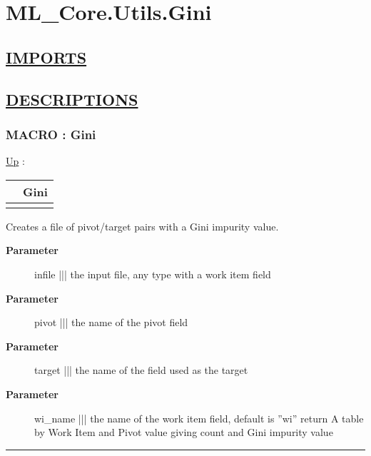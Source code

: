 \chapter*{ML\_Core.Utils.Gini}
\hypertarget{ecldoc:toc:ML_Core.Utils.Gini}{}

\section*{\underline{IMPORTS}}

\section*{\underline{DESCRIPTIONS}}
\subsection*{MACRO : Gini}
\hypertarget{ecldoc:ml_core.utils.gini}{}
\hyperlink{ecldoc:toc:ML_Core/Utils}{Up} :

{\renewcommand{\arraystretch}{1.5}
\begin{tabularx}{\textwidth}{|>{\raggedright\arraybackslash}l|X|}
\hline
\hspace{0pt} & Gini \\
\hline
\multicolumn{2}{|>{\raggedright\arraybackslash}X|}{\hspace{0pt}(infile, pivot, target, wi\_name='wi')} \\
\hline
\end{tabularx}
}

\par
Creates a file of pivot/target pairs with a Gini impurity value.

\par
\begin{description}
\item [\textbf{Parameter}] infile ||| the input file, any type with a work item field
\item [\textbf{Parameter}] pivot ||| the name of the pivot field
\item [\textbf{Parameter}] target ||| the name of the field used as the target
\item [\textbf{Parameter}] wi\_name ||| the name of the work item field, default is ''wi'' return A table by Work Item and Pivot value giving count and Gini impurity value
\end{description}

\rule{\linewidth}{0.5pt}
